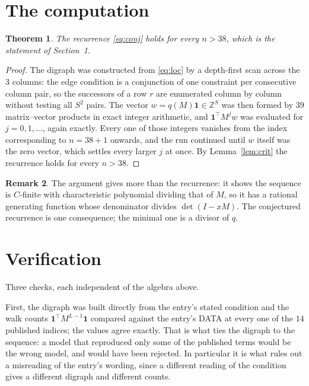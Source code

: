 \documentclass[11pt,a4paper]{article}
\theoremstyle{plain}
\newtheorem{theorem}{Theorem}
\theoremstyle{definition}
\newtheorem{remark}[theorem]{Remark}
\begin{document}
\section{The computation}

\begin{theorem}
The recurrence \eqref{eq:conj} holds for every $n>38$, which is the statement of
Section~1.
\end{theorem}

\begin{proof}
The digraph was constructed from \eqref{eq:loc} by a depth-first scan across the $3$
columns: the edge condition is a conjunction of one constraint per consecutive column
pair, so the successors of a row $r$ are enumerated column by column without testing all
$S^2$ pairs. The vector $w=q(M)\mathbf{1}\in\mathbb{Z}^{S}$ was then formed by $39$
matrix--vector products in exact integer arithmetic, and $\mathbf{1}^{\!\top}M^{j}w$ was
evaluated for $j=0,1,\dots$, again exactly. Every one of those integers vanishes from the
index corresponding to $n=38+1$ onwards, and the run continued until $w$ itself was the
zero vector, which settles every larger $j$ at once. By Lemma~\ref{lem:crit} the recurrence
holds for every $n>38$.
\end{proof}

\begin{remark}
The argument gives more than the recurrence: it shows the sequence is $C$-finite with
characteristic polynomial dividing that of $M$, so it has a rational generating function
whose denominator divides $\det(I-xM)$. The conjectured recurrence is one consequence; the
minimal one is a divisor of $q$.
\end{remark}

\section{Verification}

Three checks, each independent of the algebra above.

First, the digraph was built directly from the entry's stated condition and the walk counts
$\mathbf{1}^{\!\top}M^{L-1}\mathbf{1}$ compared against the entry's DATA at
every one of the $14$ published indices; the values agree exactly. That is what ties
the digraph to the sequence: a model that reproduced only some of the published terms would
be the wrong model, and would have been rejected. In particular it is what rules out a
misreading of the entry's wording, since a different reading of the condition gives a
different digraph and different counts.
\end{document}
